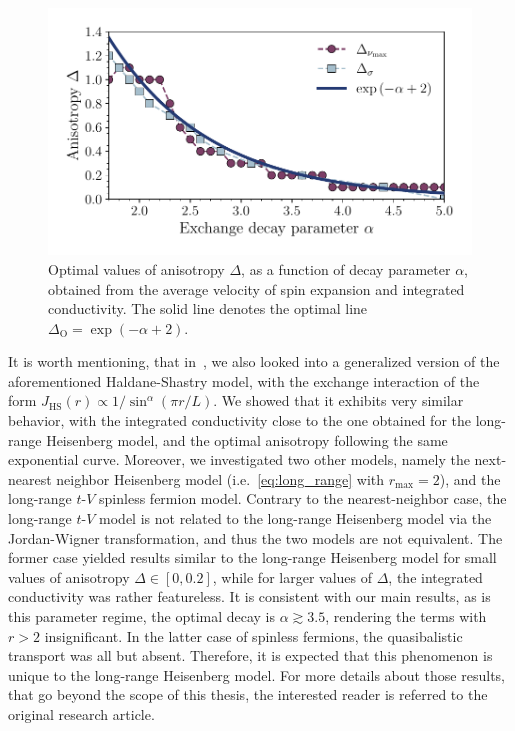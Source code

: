 \begin{figure}[htbp]
  \centering
  \includegraphics[width=0.8\linewidth]{Figures/optimal_anisotropies.pdf}
  \caption{Optimal values of anisotropy \(\Delta\), as a function of decay parameter \(\alpha\), obtained from
    the average velocity of spin expansion and integrated conductivity. The solid line denotes the optimal line
    \(\Delta_{\mathrm{O}} = \exp\left(-\alpha + 2\right)\).}
  \label{fig:optimal_anisotropy}
\end{figure}


It is worth mentioning, that in~\textcite{Mierzejewski2023},
we also looked into a generalized version of the aforementioned Haldane-Shastry model,
with the exchange interaction of the form \(J_{\mathrm{HS}}(r) \propto 1/\sin^{\alpha}(\pi r/L)\).
We showed that it exhibits very similar behavior, with the integrated conductivity
close to the one obtained for the long-range Heisenberg model, and the optimal anisotropy
following the same exponential curve. Moreover, we investigated two other
models, namely the next-nearest neighbor Heisenberg model (i.e.~\eqref{eq:long_range} with \(r_\mathrm{max} = 2\)),
and the long-range \(t\)-\(V\) spinless fermion model.
Contrary to the nearest-neighbor case, the long-range \(t\)-\(V\) model is not related to the long-range
Heisenberg model via the Jordan-Wigner transformation, and thus the two models are not equivalent.
The former case yielded results similar to the long-range Heisenberg model for small values
of anisotropy \(\Delta\in\left[0,0.2\right]\), while for larger values of \(\Delta\), the integrated conductivity
was rather featureless. It is consistent with our main results, as is this parameter regime, the optimal
decay is \(\alpha \gtrsim 3.5\), rendering the terms with \(r > 2\) insignificant.
In the latter case of spinless fermions, the quasibalistic transport was all but absent. Therefore,
it is expected that this phenomenon is unique to the long-range Heisenberg model.
For more details about those results, that go beyond the scope of this thesis, the interested reader is referred to
the original research article.
